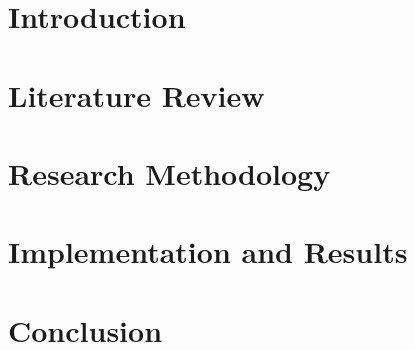 \documentclass[12pt,paper=a4,oneside,cleardoubleage=plain,final]{report}
\newcommand{\comment}[1]{}
\begin{document}
\chapter{Introduction}
\setcounter{page}{1}


\chapter{Literature Review}


\chapter{Research Methodology}
\label{chap:3}


\chapter{Implementation and Results}
\label{chap:4}


\comment{summary, conclusion and recommendation}
\chapter{Conclusion}



\comment {
Definition. An appendix contains supplementary material that is not an essential part of the text itself but which may be helpful in providing a more comprehensive understanding of the research problem or it is information that is too cumbersome to be included in the body of the paper.
}

\renewcommand{\bibname}{References}



\appendix

\end{document}
